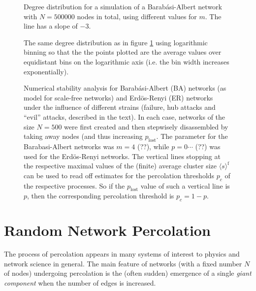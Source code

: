 \documentclass{scrartcl}
\begin{document}
\begin{figure}
    \caption{Degree distribution for a simulation of a Barab\'asi-Albert
    network with $N=500000$ nodes in total, using different values for
    $m$. The line has a slope of $-3$.}
    \label{fig:22_plot}
\end{figure}
\begin{figure}
    \caption{The same degree distribution as in figure \ref{fig:22_plot}
    using logarithmic binning so that the the points plotted are the average
    values over equidistant bins on the logarithmic axis (i.e. the bin width
    increases exponentially).}
    \label{fig:22_logplot}
\end{figure}

\begin{figure}
    \caption{Numerical stability analysis for Barab\'asi-Albert (BA) networks
    (as model for scale-free networks) and Erdös-Renyi (ER) networks under
    the influence of different strains (failure, hub attacks and
    \enquote{evil} attacks, described in the text). In each case, networks
    of the size $N=500$ were first created and then stepwisely disassembled
    by taking away nodes (and thus increasing $p_\mathrm{lost}$. The
    parameter for the Barabasi-Albert networks was $m = 4$ (??), while
    $p=0\cdots$ (??) was used for the Erdös-Renyi networks. The vertical
    lines stopping at the respective maximal values of the (finite) average
    cluster size $\langle s\rangle^\mathrm{f}$ can be used to read off
    estimates for the percolation thresholds $p_c$ of the respective
    processes. So if the $p_\mathrm{lost}$ value of such a vertical line is
    $p$, then the corresponding percolation threshold is $p_c = 1-p$.}
    \label{fig:24_ba}
\end{figure}

\clearpage
\clearpage


\section{Random Network Percolation}
The process of percolation appears in many systems of interest to physics
and network science in general. The main feature of networks (with a fixed
number $N$ of nodes) undergoing percolation is the (often sudden) emergence
of a single \emph{giant component} when the number of edges is increased.
\end{document}
